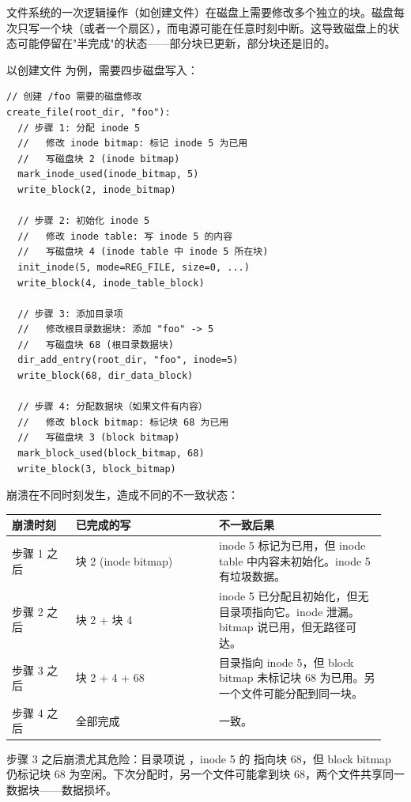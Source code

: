 \begin{filesystemlayout}


文件系统的一次逻辑操作（如创建文件）在磁盘上需要修改多个独立的块。磁盘每次只写一个块（或者一个扇区），而电源可能在任意时刻中断。这导致磁盘上的状态可能停留在"半完成"的状态——部分块已更新，部分块还是旧的。

以创建文件  为例，需要四步磁盘写入：

\begin{lstlisting}
// 创建 /foo 需要的磁盘修改
create_file(root_dir, "foo"):
  // 步骤 1: 分配 inode 5
  //   修改 inode bitmap: 标记 inode 5 为已用
  //   写磁盘块 2 (inode bitmap)
  mark_inode_used(inode_bitmap, 5)
  write_block(2, inode_bitmap)

  // 步骤 2: 初始化 inode 5
  //   修改 inode table: 写 inode 5 的内容
  //   写磁盘块 4 (inode table 中 inode 5 所在块)
  init_inode(5, mode=REG_FILE, size=0, ...)
  write_block(4, inode_table_block)

  // 步骤 3: 添加目录项
  //   修改根目录数据块: 添加 "foo" -> 5
  //   写磁盘块 68 (根目录数据块)
  dir_add_entry(root_dir, "foo", inode=5)
  write_block(68, dir_data_block)

  // 步骤 4: 分配数据块（如果文件有内容）
  //   修改 block bitmap: 标记块 68 为已用
  //   写磁盘块 3 (block bitmap)
  mark_block_used(block_bitmap, 68)
  write_block(3, block_bitmap)
\end{lstlisting}

崩溃在不同时刻发生，造成不同的不一致状态：

\begin{longtable}{|F{0.16\linewidth}|F{0.36\linewidth}|F{0.42\linewidth}|}
\toprule
{}
崩溃时刻 & 已完成的写 & 不一致后果 \\
\midrule
步骤 1 之后 & 块 2 (inode bitmap) & inode 5 标记为已用，但 inode table 中内容未初始化。inode 5 有垃圾数据。 \\\tablerowrule
步骤 2 之后 & 块 2 + 块 4 & inode 5 已分配且初始化，但无目录项指向它。inode 泄漏。bitmap 说已用，但无路径可达。 \\\tablerowrule
步骤 3 之后 & 块 2 + 4 + 68 & 目录指向 inode 5，但 block bitmap 未标记块 68 为已用。另一个文件可能分配到同一块。 \\\tablerowrule
步骤 4 之后 & 全部完成 & 一致。 \\
\bottomrule
\end{longtable}

步骤 3 之后崩溃尤其危险：目录项说 ，inode 5 的  指向块 68，但 block bitmap 仍标记块 68 为空闲。下次分配时，另一个文件可能拿到块 68，两个文件共享同一数据块——数据损坏。


\end{filesystemlayout}
